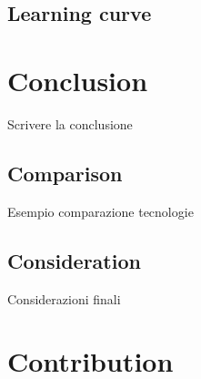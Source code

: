 \documentclass[12pt,a4paper,openright,twoside]{book}
\begin{document}
\section{Learning curve}






\chapter{Conclusion}
Scrivere la conclusione

\section{Comparison}
Esempio comparazione tecnologie

\section{Consideration}
Considerazioni finali



\chapter{Contribution}


%

\end{document}
